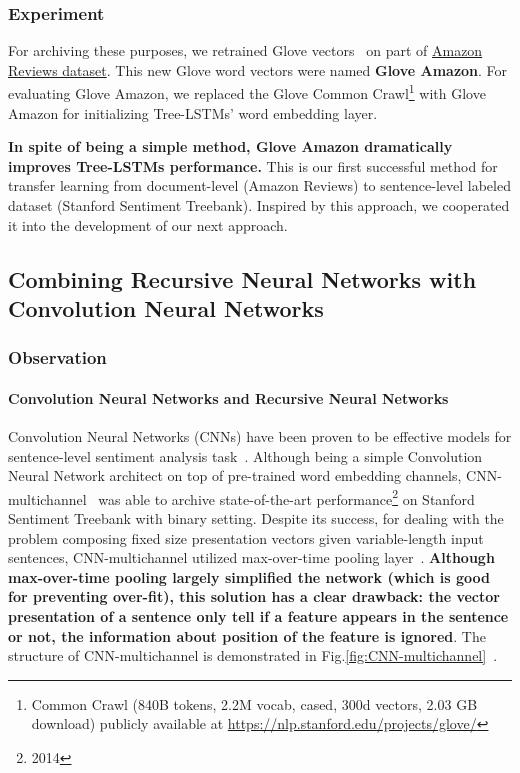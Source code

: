 \subsubsection{Experiment}
For archiving these purposes, we retrained Glove vectors~\cite{glove} on part of  \hyperref[sec:amazon]{Amazon Reviews dataset}.
This new Glove word vectors were named \textbf{Glove Amazon}.
For evaluating Glove Amazon, we replaced the Glove Common Crawl\footnote{Common Crawl (840B tokens, 2.2M vocab, cased, 300d vectors, 2.03 GB download) publicly available at \url{https://nlp.stanford.edu/projects/glove/}} with Glove Amazon for initializing Tree-LSTMs' word embedding layer.

\textbf{In spite of being a simple method, Glove Amazon dramatically improves Tree-LSTMs performance.}
This is our first successful method for transfer learning from document-level (Amazon Reviews) to sentence-level labeled dataset (Stanford Sentiment Treebank).
Inspired by this approach, we cooperated it into the development of our next approach.

\subsection{Combining Recursive Neural Networks with Convolution Neural Networks}

\subsubsection{Observation}
\paragraph{Convolution Neural Networks and Recursive Neural Networks}
Convolution Neural Networks (CNNs) have been proven to be effective models for sentence-level sentiment analysis task~\cite{KimCNN}.
Although being a simple Convolution Neural Network architect on top of pre-trained word embedding channels, CNN-multichannel~\cite{KimCNN} was able to archive state-of-the-art performance\footnote{2014} on Stanford Sentiment Treebank with binary setting.
Despite its success, for dealing with the problem composing fixed size presentation vectors given variable-length input sentences, CNN-multichannel utilized max-over-time pooling layer~\cite{nlp-scratch}.
\textbf{Although max-over-time pooling largely simplified the network (which is good for preventing over-fit), this solution has a clear drawback: the vector presentation of a sentence only tell if a feature appears in the sentence or not, the information about position of the feature is ignored}.
The structure of CNN-multichannel is demonstrated in Fig.\ref{fig:CNN-multichannel}~\cite{KimCNN}.

